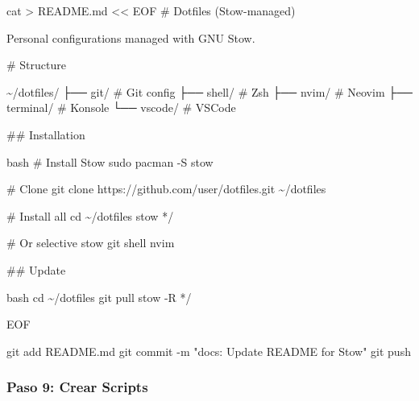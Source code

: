 \documentclass[
  doc,
  floatsintext,
  longtable,
  a4paper,
  nolmodern,
  notxfonts,
  notimes,
  12pt,
  colorlinks=true,linkcolor=blue,citecolor=blue,urlcolor=blue]{apa7}
\newenvironment{Shaded}{\begin{snugshade}}{\end{snugshade}}
\newcommand{\AttributeTok}[1]{\textcolor[rgb]{0.40,0.45,0.13}{#1}}
\newcommand{\CommentTok}[1]{\textcolor[rgb]{0.37,0.37,0.37}{#1}}
\newcommand{\FunctionTok}[1]{\textcolor[rgb]{0.28,0.35,0.67}{#1}}
\newcommand{\NormalTok}[1]{\textcolor[rgb]{0.00,0.23,0.31}{#1}}
\newcommand{\OperatorTok}[1]{\textcolor[rgb]{0.37,0.37,0.37}{#1}}
\newcommand{\StringTok}[1]{\textcolor[rgb]{0.13,0.47,0.30}{#1}}
\begin{document}
\begin{Shaded}
\begin{Highlighting}[]
\FunctionTok{cat} \OperatorTok{\textgreater{}}\NormalTok{ README.md }\OperatorTok{\textless{}\textless{} \textquotesingle{}EOF\textquotesingle{}}
\StringTok{\# Dotfiles (Stow{-}managed)}

\StringTok{Personal configurations managed with GNU Stow.}

\StringTok{\# Structure}

\StringTok{\textasciigrave{}\textasciigrave{}}
\StringTok{\textasciitilde{}/dotfiles/}
\StringTok{├── git/          \# Git config}
\StringTok{├── shell/        \# Zsh}
\StringTok{├── nvim/         \# Neovim}
\StringTok{├── terminal/     \# Konsole}
\StringTok{└── vscode/       \# VSCode}
\StringTok{\textasciigrave{}\textasciigrave{}}

\StringTok{\#\# Installation}

\StringTok{\textasciigrave{}\textasciigrave{}bash}
\StringTok{\# Install Stow}
\StringTok{sudo pacman {-}S stow}

\StringTok{\# Clone}
\StringTok{git clone https://github.com/user/dotfiles.git \textasciitilde{}/dotfiles}

\StringTok{\# Install all}
\StringTok{cd \textasciitilde{}/dotfiles}
\StringTok{stow */}

\StringTok{\# Or selective}
\StringTok{stow git shell nvim}
\StringTok{\textasciigrave{}\textasciigrave{}}

\StringTok{\#\# Update}

\StringTok{\textasciigrave{}\textasciigrave{}bash}
\StringTok{cd \textasciitilde{}/dotfiles}
\StringTok{git pull}
\StringTok{stow {-}R */}
\StringTok{\textasciigrave{}\textasciigrave{}}

\OperatorTok{EOF}

\FunctionTok{git}\NormalTok{ add README.md}
\FunctionTok{git}\NormalTok{ commit }\AttributeTok{{-}m} \StringTok{"docs: Update README for Stow"}
\FunctionTok{git}\NormalTok{ push}
\end{Highlighting}
\end{Shaded}

\subsubsection{Paso 9: Crear Scripts}\label{paso-9-crear-scripts}

\begin{Shaded}
\end{Shaded}
\end{document}
